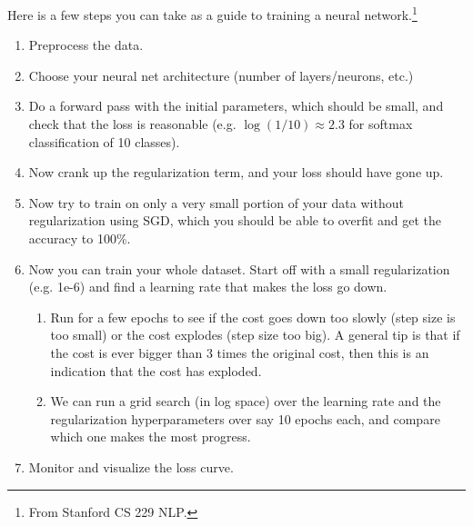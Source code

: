 \documentclass{article}
\begin{document}
  Here is a few steps you can take as a guide to training a neural network.\footnote{From Stanford CS 229 NLP.}
  \begin{enumerate}
    \item Preprocess the data. 
    \item Choose your neural net architecture (number of layers/neurons, etc.) 
    \item Do a forward pass with the initial parameters, which should be small, and check that the loss is reasonable (e.g. $\log(1/10) \approx 2.3$ for softmax classification of 10 classes). 
    \item Now crank up the regularization term, and your loss should have gone up. 
    \item Now try to train on only a very small portion of your data without regularization using SGD, which you should be able to overfit and get the accuracy to 100\%. 
    \item Now you can train your whole dataset. Start off with a small regularization (e.g. 1e-6) and find a learning rate that makes the loss go down. 
    \begin{enumerate}
        \item Run for a few epochs to see if the cost goes down too slowly (step size is too small) or the cost explodes (step size too big). A general tip is that if the cost is ever bigger than $3$ times the original cost, then this is an indication that the cost has exploded. 
        \item We can run a grid search (in log space) over the learning rate and the regularization hyperparameters over say 10 epochs each, and compare which one makes the most progress. 
    \end{enumerate}
    \item Monitor and visualize the loss curve. 

    \begin{figure}[H]
      \centering 
\end{figure}
\end{enumerate}
\end{document}
